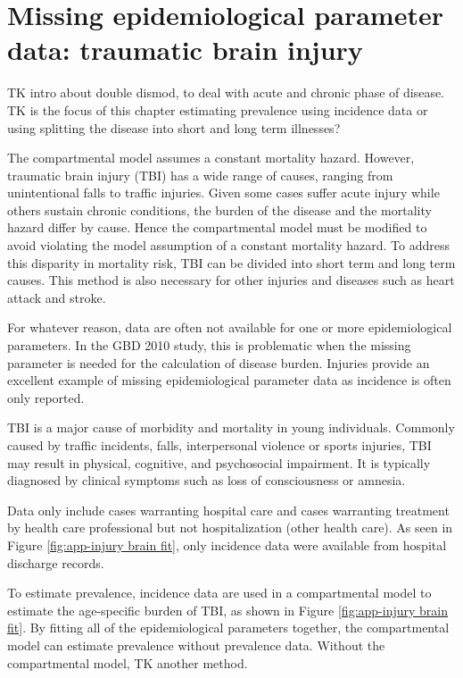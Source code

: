 \chapter{Missing epidemiological parameter data: traumatic brain injury}
\label{applications-double_dismod}

TK intro about double dismod, to deal with acute and chronic phase of disease.
TK is the focus of this chapter estimating prevalence using incidence data
or using splitting the disease into short and long term illnesses?

The compartmental model assumes a constant mortality hazard.
However, traumatic brain injury (TBI) has a wide range of
causes, ranging from unintentional falls to traffic injuries.
Given some cases suffer acute injury while others sustain
chronic conditions, the burden of the disease and the mortality hazard
differ by cause.  Hence the compartmental model must be modified
to avoid violating the model assumption of a
constant mortality hazard.  To address this disparity in mortality
risk, TBI can be divided into short term and long term
causes.  This method is also necessary for other injuries and
diseases such as heart attack and stroke.

For whatever reason, data are often not available for one or more
epidemiological parameters.  In the GBD 2010 study, this is
problematic when the missing parameter is needed for the calculation
of disease burden.  Injuries provide an excellent example of missing
epidemiological parameter data as incidence is often only reported.

TBI is a major cause of morbidity and
mortality in young individuals. Commonly caused by traffic
incidents, falls, interpersonal violence or sports injuries,
TBI may result in physical, cognitive, and psychosocial impairment.
It is typically diagnosed by clinical symptoms such as loss of
consciousness or amnesia. \cite{maas_moderate_2008, 
nih_consensus_development_panel_on_rehabilitation_of_persons_with_traumatic_brain_injury_rehabilitation_1999,
bruns_epidemiology_2003}

Data only include cases warranting hospital care and cases warranting
treatment by health care professional but not hospitalization (other
health care).  As seen in Figure \ref{fig:app-injury brain fit},
only incidence data were available from hospital discharge records.

To estimate prevalence, incidence data are used in a compartmental model to estimate the
age-specific burden of TBI, as shown in Figure
\ref{fig:app-injury brain fit}.  By fitting all of the epidemiological
parameters together, the compartmental model can estimate prevalence
without prevalence data.  Without the compartmental model, TK another method.

